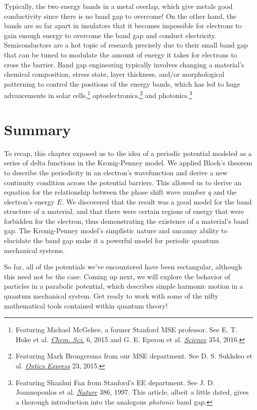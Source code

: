 Typically, the two energy bands in a metal overlap, which give metals good conductivity since there is no band gap to overcome! 
On the other hand, the bands are so far apart in insulators that it becomes impossible for electrons to gain enough energy to overcome the band gap and conduct electricity. 
Semiconductors are a hot topic of research precisely due to their small band gap that can be tuned to modulate the amount of energy it takes for electrons to cross the barrier. 
Band gap engineering typically involves changing a material's chemical composition, stress state, layer thickness, and/or morphological patterning to control the positions of the energy bands, which has led to huge advancements in solar cells,\footnote{Featuring Michael McGehee, a former Stanford MSE professor. See E. T. Hoke et al. \href{https://pubs.rsc.org/en/content/articlelanding/2015/sc/c4sc03141e}{\emph{Chem. Sci.}} 6, 2015 and G. E. Eperon et al. \href{http://science.sciencemag.org/content/354/6314/861.full}{\emph{Science}} 354, 2016.} optoelectronics,\footnote{Featuring Mark Brongersma from our MSE department. See D. S. Sukhdeo et al. \href{https://www.osapublishing.org/oe/abstract.cfm?uri=oe-23-13-16740}{\emph{Optics Express}} 23, 2015.} and photonics.\footnote{Featuring Shanhui Fan from Stanford's EE department. See J. D. Joannopoulos et al. \href{https://www.nature.com/articles/386143a0}{\emph{Nature}} 386, 1997. This article, albeit a little dated, gives a thorough introduction into the analogous \emph{photonic} band gap.}


\section{Summary}

To recap, this chapter exposed us to the idea of a periodic potential modeled as a series of delta functions in the Kronig-Penney model. 
We applied Bloch's theorem to describe the periodicity in an electron's wavefunction and derive a new continuity condition across the potential barriers. 
This allowed us to derive an equation for the relationship between the phase shift wave number $q$ and the electron's energy $E$. 
We discovered that the result was a good model for the band structure of a material, and that there were certain regions of energy that were forbidden for the electron, thus demonstrating the existence of a material's band gap. 
The Kronig-Penney model's simplistic nature and uncanny ability to elucidate the band gap make it a powerful model for periodic quantum mechanical systems. 

So far, all of the potentials we've encountered have been rectangular, although this need not be the case. 
Coming up next, we will explore the behavior of particles in a parabolic potential, which describes simple harmonic motion in a quantum mechanical system. 
Get ready to work with some of the nifty mathematical tools contained within quantum theory!

%